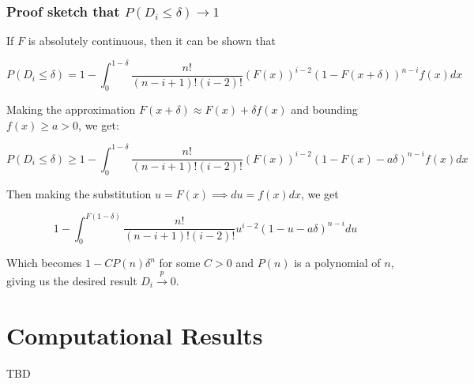 \documentclass[
  11pt,
]{article}
\begin{document}
\hypertarget{proof-sketch-that-pd_i-leq-delta-to-1}{%
\subsubsection{\texorpdfstring{Proof sketch that
\(P(D_i \leq \delta) \to 1\)}{Proof sketch that P(D\_i \textbackslash leq \textbackslash delta) \textbackslash to 1}}\label{proof-sketch-that-pd_i-leq-delta-to-1}}

If \(F\) is absolutely continuous, then it can be shown that

\[P(D_i \leq \delta) = 1 - \int_0^{1-\delta} \frac{n!}{(n-i+1)! (i-2)!} (F(x))^{i-2} (1 - F(x + \delta))^{n-i} f(x) dx\]

Making the approximation \(F(x+\delta) \approx F(x) + \delta f(x)\) and
bounding \(f(x) \geq a > 0\), we get:

\[P(D_i \leq \delta) \geq 1 - \int_0^{1-\delta} \frac{n!}{(n-i+1)! (i-2)!} (F(x))^{i-2} (1 - F(x) - a \delta)^{n-i} f(x) dx\]

Then making the substitution \(u = F(x) \implies du = f(x) dx\), we get

\[1 - \int_0^{F(1-\delta)} \frac{n!}{(n-i+1)! (i-2)!} u^{i-2} (1 - u - a \delta)^{n-i} du\]

Which becomes \(1 - C P(n) \delta^{n}\) for some \(C > 0\) and \(P(n)\)
is a polynomial of \(n\), giving us the desired result
\(D_i \stackrel{p}{\to} 0\).

\hypertarget{computational-results}{%
\section{Computational Results}\label{computational-results}}

TBD

  
\end{document}
